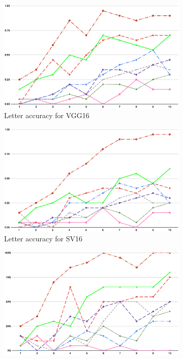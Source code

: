 \documentclass[conference]{IEEEtran}
\begin{document}
\begin{figure}[h]
    \begin{subfigure}[t]{0.5\textwidth}
    \centering\captionsetup{width=.8\linewidth}
    \includegraphics[width=1\linewidth, keepaspectratio]{images/v1intensificationnolabel.eps}
    \caption{Letter accuracy for VGG16 \label{image:v1intensification2}}
    \end{subfigure}
    \begin{subfigure}[t]{0.5\textwidth}
    \centering\captionsetup{width=.8\linewidth}
    \includegraphics[width=1\linewidth, keepaspectratio]{images/v2intensificationnolabel.eps}
    \caption{Letter accuracy for SV16 \label{image:v2intensification2}}
    \end{subfigure}
    \begin{subfigure}[t]{0.5\textwidth}
    \centering\captionsetup{width=.8\linewidth}
    \includegraphics[width=1\linewidth, keepaspectratio]{images/v3intensificationnolabel.eps}

\end{subfigure}
\end{figure}
\end{document}
